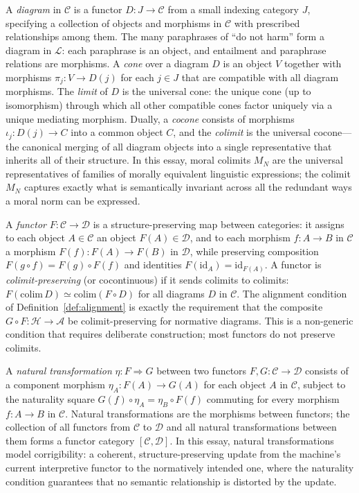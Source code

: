 \documentclass[12pt]{article}
\theoremstyle{definition}
\begin{document}
A \emph{diagram} in $\mathcal{C}$ is a functor $D : J \to \mathcal{C}$ from a
small indexing category $J$, specifying a collection of objects and morphisms
in $\mathcal{C}$ with prescribed relationships among them. The many paraphrases
of ``do not harm'' form a diagram in $\mathcal{L}$: each paraphrase is an
object, and entailment and paraphrase relations are morphisms. A \emph{cone}
over a diagram $D$ is an object $V$ together with morphisms $\pi_j : V \to D(j)$
for each $j \in J$ that are compatible with all diagram morphisms. The
\emph{limit} of $D$ is the universal cone: the unique cone (up to isomorphism)
through which all other compatible cones factor uniquely via a unique mediating
morphism. Dually, a \emph{cocone} consists of morphisms $\iota_j : D(j) \to C$
into a common object $C$, and the \emph{colimit} is the universal cocone---the
canonical merging of all diagram objects into a single representative that
inherits all of their structure. In this essay, moral colimits $M_N$ are the
universal representatives of families of morally equivalent linguistic
expressions; the colimit $M_N$ captures exactly what is semantically
invariant across all the redundant ways a moral norm can be expressed.

A \emph{functor} $F : \mathcal{C} \to \mathcal{D}$ is a structure-preserving
map between categories: it assigns to each object $A \in \mathcal{C}$ an object
$F(A) \in \mathcal{D}$, and to each morphism $f : A \to B$ in $\mathcal{C}$ a
morphism $F(f) : F(A) \to F(B)$ in $\mathcal{D}$, while preserving composition
$F(g \circ f) = F(g) \circ F(f)$ and identities $F(\mathrm{id}_A) =
\mathrm{id}_{F(A)}$. A functor is \emph{colimit-preserving} (or cocontinuous)
if it sends colimits to colimits: $F(\mathrm{colim}\,D) \simeq
\mathrm{colim}(F \circ D)$ for all diagrams $D$ in $\mathcal{C}$. The alignment
condition of Definition~\ref{def:alignment} is exactly the requirement that
the composite $G \circ F : \mathcal{H} \to \mathcal{A}$ be colimit-preserving
for normative diagrams. This is a non-generic condition that requires
deliberate construction; most functors do not preserve colimits.

A \emph{natural transformation} $\eta : F \Rightarrow G$ between two functors
$F, G : \mathcal{C} \to \mathcal{D}$ consists of a component morphism
$\eta_A : F(A) \to G(A)$ for each object $A$ in $\mathcal{C}$, subject to the
naturality square $G(f) \circ \eta_A = \eta_B \circ F(f)$ commuting for every
morphism $f : A \to B$ in $\mathcal{C}$. Natural transformations are the
morphisms between functors; the collection of all functors from $\mathcal{C}$
to $\mathcal{D}$ and all natural transformations between them forms a functor
category $[\mathcal{C}, \mathcal{D}]$. In this essay, natural transformations
model corrigibility: a coherent, structure-preserving update from the machine's
current interpretive functor to the normatively intended one, where the
naturality condition guarantees that no semantic relationship is distorted by
the update.
\end{document}
